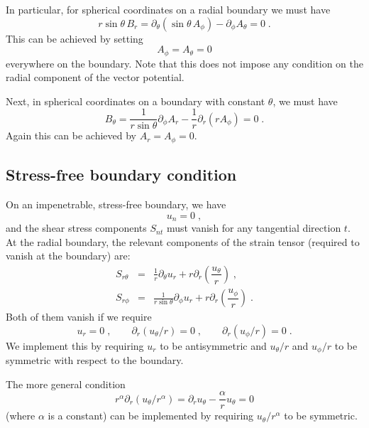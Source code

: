 \documentclass[\mydriver,12pt,twoside,notitlepage,a4paper]{article}
\begin{document}
In particular, for spherical coordinates on a radial boundary
we must have
\begin{equation}
  r \sin \theta \, B_r
    = \partial_{\theta} (\sin\theta \, A_\phi)
      - \partial_\phi A_\theta
    = 0 \; .
\end{equation}
This can be achieved by setting
\begin{equation}
  A_{\phi} = A_{\theta} = 0
\end{equation}
everywhere on the boundary.
Note that this does not impose any condition on the radial component of
the vector potential.

Next, in spherical coordinates on a boundary with constant $\theta$, we
must have
\begin{equation}
  B_{\theta} = \frac{1}{r\sin\theta} \partial_{\phi} A_{r}
               - \frac{1}{r} \partial_{r} (r A_{\phi})
             = 0 \; .
\end{equation}
Again this can be achieved by $A_{r}=A_{\phi}=0$.



\subsection{Stress-free boundary condition}
On an impenetrable, stress-free boundary, we have
\begin{equation}
  u_n = 0 \; ,
\end{equation}
and the shear stress components $S_{nt}$ must vanish for any tangential
direction $t$.
At the radial boundary, the relevant components of the strain tensor
(required to vanish at the boundary) are:
\begin{eqnarray}
  S_{r\theta} &=& \frac{1}{r} \partial_{\theta} u_r
                  + r \partial_r \left( \dfrac{u_\theta}{r} \right) \; , \\
  S_{r\phi}   &=& \frac{1}{r\sin\theta} \partial_{\phi} u_r
                  + r \partial_r \left( \dfrac{u_\phi}{r} \right) \; .
\end{eqnarray}
Both of them vanish if we require
\begin{equation}
  u_r = 0 \; ,
  \qquad
  \partial_r(u_\theta/r) = 0 \; ,
  \qquad
  \partial_r(u_\phi/r) = 0 \; .
\end{equation}
We implement this by requiring $u_r$ to be antisymmetric and $u_\theta/r$
and $u_\phi/r$ to be symmetric with respect to the boundary.

The more general condition
\begin{equation}
  r^\alpha \partial_r (u_\theta/r^\alpha)
  = \partial_r u_{\theta} -\frac{\alpha}{r} u_{\theta}
  = 0
\end{equation}
(where $\alpha$ is a constant) can be implemented by requiring
$u_{\theta} / r^{\alpha}$ to be symmetric.
\end{document}
